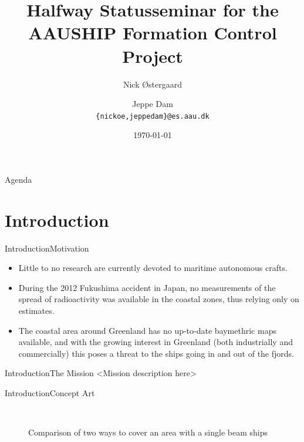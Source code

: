 \documentclass[10pt,handout]{beamer}
\title[AAUSHIP\\ Formation Control]%
{Halfway Statusseminar for the\\ AAUSHIP Formation Control Project}
\author[14gr1034]{%
  Nick Østergaard \and Jeppe Dam\\
  {{\tt \{nickoe,jeppedam\}@es.aau.dk}}
}
\institute[
  Dept.\ of Electronic Systems,\\
  Aalborg University,\\
  Denmark
] %
{%
  Department of Electronic Systems,\\
  Aalborg University,\\
  Denmark
  
}
\date{\today}
\begin{document}
\begin{frame}[plain] %
  \titlepage
\end{frame}

\begin{frame}{Agenda}{}
\tableofcontents
\end{frame}
\section{Introduction}
\begin{frame}{Introduction}{Motivation}
  \begin{itemize}
    \item<1-> Little to no research are currently devoted to maritime autonomous crafts.
    \item<2-> During the 2012 Fukushima accident in Japan, no measurements of the spread of radioactivity was available in the coastal zones, thus relying only on estimates. 
    \item<3-> The coastal area around Greenland has no up-to-date baymethric maps available, and with the growing interest in Greenland (both industrially and commercially) this poses a threat to the ships going in and out of the fjords.
  \end{itemize}
\end{frame}

\begin{frame}{Introduction}{The Mission}
<Mission description here>
\end{frame}

\begin{frame}{Introduction}{Concept Art}
\begin{figure}
  \centering
  \ %
  \caption{Comparison of two ways to cover an area with a single beam ships}
  \label{fig:concept-art}
\end{figure}
\end{frame}
\end{document}
